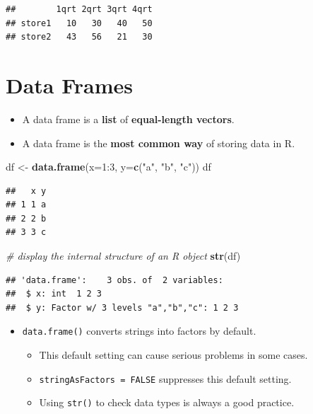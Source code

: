 \documentclass[]{book}
\newenvironment{Shaded}{\begin{snugshade}}{\end{snugshade}}
\newcommand{\KeywordTok}[1]{\textcolor[rgb]{0.13,0.29,0.53}{\textbf{{#1}}}}
\newcommand{\DataTypeTok}[1]{\textcolor[rgb]{0.13,0.29,0.53}{{#1}}}
\newcommand{\DecValTok}[1]{\textcolor[rgb]{0.00,0.00,0.81}{{#1}}}
\newcommand{\StringTok}[1]{\textcolor[rgb]{0.31,0.60,0.02}{{#1}}}
\newcommand{\CommentTok}[1]{\textcolor[rgb]{0.56,0.35,0.01}{\textit{{#1}}}}
\newcommand{\NormalTok}[1]{{#1}}
\providecommand{\tightlist}{%
  \setlength{\itemsep}{0pt}\setlength{\parskip}{0pt}}
\begin{document}
\begin{verbatim}
##        1qrt 2qrt 3qrt 4qrt
## store1   10   30   40   50
## store2   43   56   21   30
\end{verbatim}

\section{Data Frames}\label{data-frames}

\begin{itemize}
\tightlist
\item
  A data frame is a \textbf{list} of \textbf{equal-length vectors}.
\item
  A data frame is the \textbf{most common way} of storing data in R.
\end{itemize}

\begin{Shaded}
\begin{Highlighting}[]
\NormalTok{df <-}\StringTok{ }\KeywordTok{data.frame}\NormalTok{(}\DataTypeTok{x=}\DecValTok{1}\NormalTok{:}\DecValTok{3}\NormalTok{, }\DataTypeTok{y=}\KeywordTok{c}\NormalTok{(}\StringTok{"a"}\NormalTok{, }\StringTok{"b"}\NormalTok{, }\StringTok{"c"}\NormalTok{))}
\NormalTok{df}
\end{Highlighting}
\end{Shaded}

\begin{verbatim}
##   x y
## 1 1 a
## 2 2 b
## 3 3 c
\end{verbatim}

\begin{Shaded}
\begin{Highlighting}[]
\CommentTok{# display the internal structure of an R object}
\KeywordTok{str}\NormalTok{(df) }
\end{Highlighting}
\end{Shaded}

\begin{verbatim}
## 'data.frame':    3 obs. of  2 variables:
##  $ x: int  1 2 3
##  $ y: Factor w/ 3 levels "a","b","c": 1 2 3
\end{verbatim}

\begin{itemize}
\tightlist
\item
  \texttt{data.frame()} converts strings into factors by default.

  \begin{itemize}
  \tightlist
  \item
    This default setting can cause serious problems in some cases.
  \item
    \texttt{stringAsFactors\ =\ FALSE} suppresses this default setting.
  \item
    Using \texttt{str()} to check data types is always a good practice.
  \end{itemize}
\end{itemize}
\end{document}
